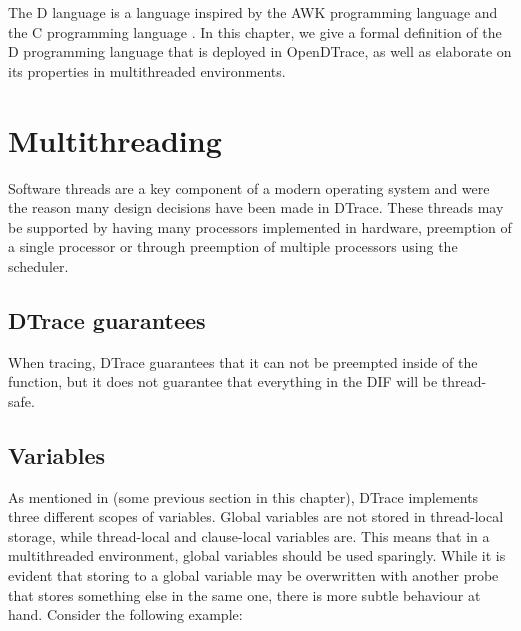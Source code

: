 The D language is a language inspired by the AWK programming language
\cite{Aho:1987:APL:29361} and the C programming language
\cite{Kernighan:1988}. In this chapter, we give a formal definition of
the D programming language that is deployed in OpenDTrace, as well as
elaborate on its properties in multithreaded environments.


\section{Multithreading}

Software threads are a key component of a modern operating system and were the
reason many design decisions have been made in DTrace. These threads may be
supported by having many processors implemented in hardware, preemption of a
single processor or through preemption of multiple processors using the
scheduler.

\subsection{DTrace guarantees}


When tracing, DTrace guarantees that it can not be preempted inside of the
 function, but it does not guarantee that everything in
the DIF will be thread-safe.

\subsection{Variables}

As mentioned in (some previous section in this chapter), DTrace implements three
different scopes of variables. Global variables are not stored in thread-local storage,
while thread-local and clause-local variables are. This means that in a
multithreaded environment, global variables should be used sparingly. While it
is evident that storing to a global variable may be overwritten with another
probe that stores something else in the same one, there is more subtle behaviour
at hand. Consider the following example:

